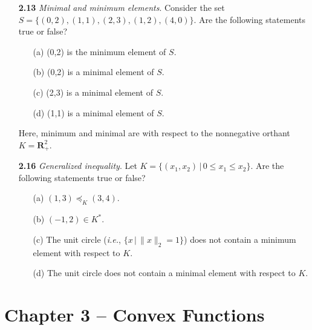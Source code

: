 \documentclass[11pt,a4paper]{article}
\begin{document}
\begin{itemize}
\begin{itemize}
\begin{figure}
\begin{subfigure}[b]{0.24\textwidth}
                \caption{}
            \end{subfigure}
        \end{figure}
    \end{itemize}
    \item[\textbf{2.13}] \textit{Minimal and minimum elements}. Consider the set $S = \{(0,2), (1,1), (2,3), (1,2), (4,0)\}$. Are the following statements true or false?
    \item[] \begin{itemize}
        \item[(a)] (0,2) is the minimum element of $S$.
        \item[(b)] (0,2) is a minimal element of $S$.
        \item[(c)] (2,3) is a minimal element of $S$.
        \item[(d)] (1,1) is a minimal element of $S$.
    \end{itemize}
        Here, minimum and minimal are with respect to the nonnegative orthant $K = \mathbf{R}_+^2$.
    \item[\textbf{2.16}] \textit{Generalized inequality}. Let $K = \{(x_1,x_2) \, \vert \, 0 \leq x_1 \leq x_2\}$. Are the following statements true or false?
    \item[] \begin{itemize}
        \item[(a)] $(1,3) \preceq_K (3,4)$.
        \item[(b)] $(-1,2) \in K^*$.
        \item[(c)] The unit circle (\textit{i.e.}, $\{x \, \vert \, \|x\|_2 = 1\}$) does not contain a minimum element with respect to $K$.
        \item[(d)] The unit circle does not contain a minimal element with respect to $K$.
    \end{itemize}
\end{itemize}

\section*{Chapter 3 -- Convex Functions}
\end{document}
